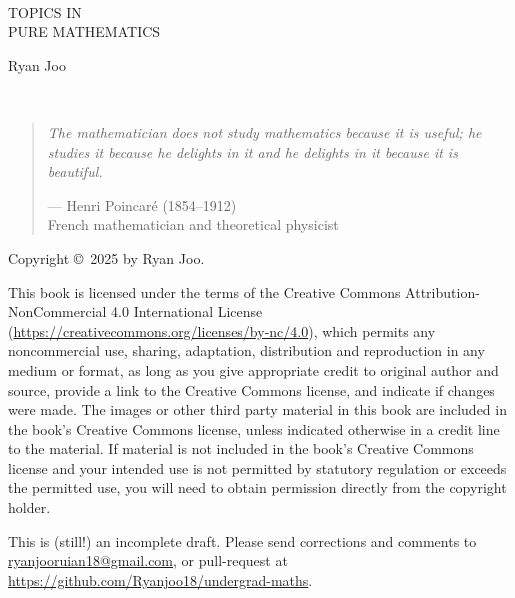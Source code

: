 \begin{center}
\

\vspace{3cm}

{\color{schoolbusyellow}\Huge
\uppercase{Topics in}\\[1em]
\uppercase{Pure Mathematics}}

\vspace{9cm}

{\color{schoolbusyellow}\huge Ryan Joo}
\end{center}
\thispagestyle{empty}
\pagecolor{smalt(darkpowderblue)}
\pagebreak

\pagecolor{white}
\thispagestyle{empty}
\

\vfill

\begin{quote}
\textit{The mathematician does not study mathematics because it is useful; he studies it because he delights in it and he delights in it because it is beautiful.}

\begin{flushright}--- Henri Poincar\'{e} (1854--1912)\\
French mathematician and theoretical physicist\end{flushright}
\end{quote}

\vfill

Copyright \copyright \ 2025 by Ryan Joo.

This book is licensed under the terms of the Creative Commons Attribution-NonCommercial 4.0 International License (\url{https://creativecommons.org/licenses/by-nc/4.0}), which permits any noncommercial use, sharing, adaptation, distribution and reproduction in any medium or format, as long as you give appropriate credit to original author and source, provide a link to the Creative Commons license, and indicate if changes were made. The images or other third party material in this book are included in the book's Creative Commons license, unless indicated otherwise in a credit line to the material. If material is not included in the book's Creative Commons license and your intended use is not permitted by statutory regulation or exceeds the permitted use, you will need to obtain permission directly from the copyright holder.

This is (still!) an incomplete draft. Please send corrections and comments to \url{ryanjooruian18@gmail.com}, or pull-request at \url{https://github.com/Ryanjoo18/undergrad-maths}.

